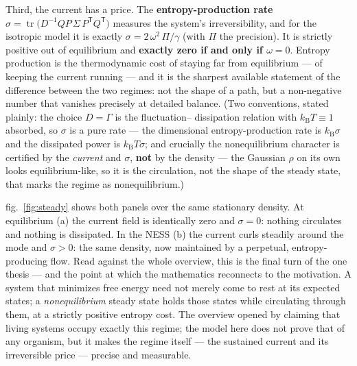 \documentclass[
  english,
]{article}
\newcounter{none} %
\begin{document}
Third, the current has a price. The \textbf{entropy-production rate}
\(\sigma = \operatorname{tr}\!\big(D^{-1} Q P\,\Sigma\,P^{\mathsf T}Q^{\mathsf T}\big)\)
measures the system's irreversibility, and for the isotropic model it is
exactly \(\sigma = 2\,\omega^2\,\Pi/\gamma\) (with \(\Pi\) the
precision). It is strictly positive out of equilibrium and
\textbf{exactly zero if and only if \(\omega=0\)}. Entropy production is
the thermodynamic cost of staying far from equilibrium --- of keeping
the current running --- and it is the sharpest available statement of
the difference between the two regimes: not the shape of a path, but a
non-negative number that vanishes precisely at detailed balance. (Two
conventions, stated plainly: the choice \(D=\Gamma\) is the
fluctuation-- dissipation relation with \(k_{\mathrm B}T\equiv1\)
absorbed, so \(\sigma\) is a pure rate --- the dimensional
entropy-production rate is \(k_{\mathrm B}\sigma\) and the dissipated
power is \(k_{\mathrm B}T\sigma\); and crucially the nonequilibrium
character is certified by the \emph{current} and \(\sigma\),
\textbf{not} by the density --- the Gaussian \(\rho\) on its own looks
equilibrium-like, so it is the circulation, not the shape of the steady
state, that marks the regime as nonequilibrium.)

fig.~\ref{fig:steady} shows both panels over the same stationary
density. At equilibrium (a) the current field is identically zero and
\(\sigma=0\): nothing circulates and nothing is dissipated. In the NESS
(b) the current curls steadily around the mode and \(\sigma>0\): the
same density, now maintained by a perpetual, entropy-producing flow.
Read against the whole overview, this is the final turn of the one
thesis --- and the point at which the mathematics reconnects to the
motivation. A system that minimizes free energy need not merely come to
rest at its expected states; a \emph{nonequilibrium} steady state holds
those states while circulating through them, at a strictly positive
entropy cost. The overview opened by claiming that living systems occupy
exactly this regime; the model here does not prove that of any organism,
but it makes the regime itself --- the sustained current and its
irreversible price --- precise and measurable.
\end{document}
